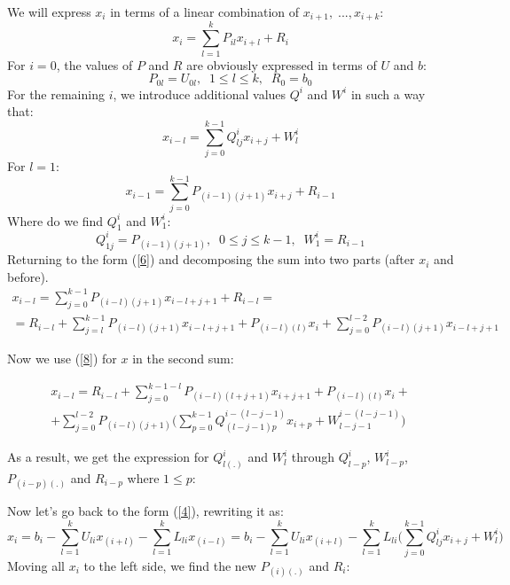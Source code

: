 \documentclass{article}
\begin{document}
We will express $x_i$ in terms of a linear combination of $x_{i+1}, \;..., x_{i+k}$: 
\begin{equation}\label{6}
    x_i = \sum_{l=1}^k P_{il} x_{i+l} + R_{i}
\end{equation}
For $i = 0$, the values of $P$ and $R$ are obviously expressed in terms of $U$ and $b$:
\begin{equation}
    P_{0l} = U_{0l}, \;\; 1 \leq l \leq k, \;\; R_0 = b_0
\end{equation}
For the remaining $i$, we introduce additional values $Q^{i}$ and $W^{i}$ in such a way that:
\begin{equation}\label{8}
    x_{i-l} = \sum_{j = 0}^{k-1} Q^{i}_{lj} x_{i + j} + W^{i}_l
\end{equation}
For $l = 1$:
\begin{equation}
    x_{i-1} = \sum_{j = 0}^{k-1} P_{(i-1)(j+1)} x_{i + j} + R_{i-1}
\end{equation}
Where do we find $Q^{i}_{1} $ and $W^i_{1}$:
\begin{equation}
    Q^i_{1j} = P_{(i-1)(j+1)}, \;\; 0 \leq j \leq k-1, \;\; W^i_{1} = R_{i-1}
\end{equation}
 Returning to the form (\ref{6}) and decomposing the sum into two parts (after $x_i$ and before).
\begin{multline}
        x_{i-l} = \sum_{j = 0}^{k-1} P_{(i-l)(j+1)} x_{i - l + j + 1} + R_{i-l} = \\ = R_{i-l} +  \sum_{j = l}^{k-1} P_{(i-l)(j+1)} x_{i - l + j + 1} + P_{(i-l)(l)}x_i  + \sum_{j = 0}^{l-2} P_{(i-l)(j+1)}  x_{i - l + j + 1}
\end{multline}

Now we use (\ref{8}) for $x$ in the second sum:

\begin{multline}
    x_{i-l} = R_{i-l} +  \sum_{j = 0}^{k-1 - l} P_{(i-l)(l + j+1)} x_{i + j + 1} + P_{(i-l)(l)}x_i + \\ + \sum_{j = 0}^{l-2} P_{(i-l)(j+1)} \Big(\sum_{p = 0}^{k-1} Q^{i - (l - j - 1)}_{(l - j - 1)p} x_{i + p} + W^{i - (l - j - 1)}_{l - j - 1} \Big)
\end{multline}

As a result, we get the expression for $Q^{i}_{l(.)}$ and $W^{i}_{l}$ through $Q^{i}_{l-p}$, $W^{i}_{l-p}$, $P_{(i-p)(.)}$ and $R_{i-p}$ where $1 \leq p$:

Now let's go back to the form (\ref{4}), rewriting it as:
\begin{equation}
      x_{i}  = b_i - \sum_{l = 1}^{k} U_{li} x_{(i+l)} - \sum_{l = 1}^{k} L_{li} x_{(i-l)} =  b_i - \sum_{l = 1}^{k} U_{li} x_{(i+l)} - \sum_{l = 1}^{k} L_{li} \Big( \sum_{j = 0}^{k-1} Q^{i}_{lj} x_{i + j} + W^{i}_l\Big)
\end{equation}
Moving all $x_i$ to the left side, we find the new $P_{(i)(.)}$ and $R_i$:
\end{document}
